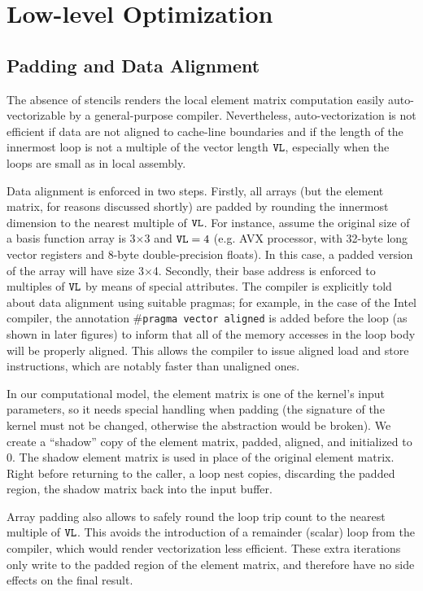 \section{Low-level Optimization}
\label{sec:lowlevelopt}


\subsection{Padding and Data Alignment}
\label{sec:coffee-padding}
The absence of stencils renders the local element matrix computation easily auto-vectorizable by a general-purpose compiler. Nevertheless, auto-vectorization is not efficient if data are not aligned to cache-line boundaries and if the length of the innermost loop is not a multiple of the vector length $\mbox{\texttt{VL}}$, especially when the loops are small as in local assembly. 

Data alignment is enforced in two steps. Firstly, all arrays (but the element matrix, for reasons discussed shortly) are padded by rounding the innermost dimension to the nearest multiple of $\mbox{\texttt{VL}}$. For instance, assume the original size of a basis function array is 3$\times$3 and $\mbox{\texttt{VL}}=4$ (e.g. AVX processor, with 32-byte long vector registers and 8-byte double-precision floats). In this case, a padded version of the array will have size 3$\times$4. Secondly, their base address is enforced to multiples of $\mbox{\texttt{VL}}$ by means of special attributes. The compiler is explicitly told about data alignment using suitable pragmas; for example, in the case of the Intel compiler, the annotation \texttt{$\#$pragma vector aligned} is added before the loop (as shown in later figures) to inform that all of the memory accesses in the loop body will be properly aligned. This allows the compiler to issue aligned load and store instructions, which are notably faster than unaligned ones.

In our computational model, the element matrix is one of the kernel's input parameters, so it needs special handling when padding (the signature of the kernel must not be changed, otherwise the abstraction would be broken). We create a ``shadow'' copy of the element matrix, padded, aligned, and initialized to 0. The shadow element matrix is used in place of the original element matrix. Right before returning to the caller, a loop nest copies, discarding the padded region, the shadow matrix back into the input buffer.

Array padding also allows to safely round the loop trip count to the nearest multiple of $\mbox{\texttt{VL}}$. This avoids the introduction of a remainder (scalar) loop from the compiler, which would render vectorization less efficient. These extra iterations only write to the padded region of the element matrix, and therefore have no side effects on the final result.

